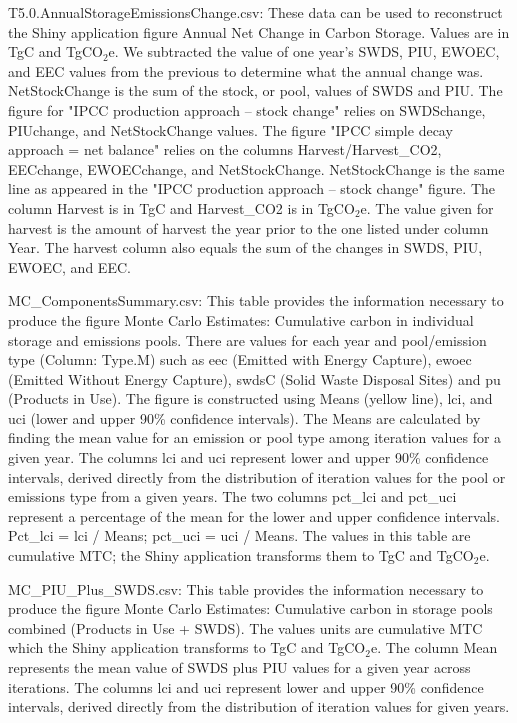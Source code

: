 \documentclass[
]{book}
\begin{document}
T5.0.AnnualStorageEmissionsChange.csv: These data can be used to reconstruct the Shiny application figure Annual Net Change in Carbon Storage. Values are in TgC and TgCO\(_2\)e. We subtracted the value of one year's SWDS, PIU, EWOEC, and EEC values from the previous to determine what the annual change was. NetStockChange is the sum of the stock, or pool, values of SWDS and PIU. The figure for "IPCC production approach -- stock change" relies on SWDSchange, PIUchange, and NetStockChange values. The figure "IPCC simple decay approach = net balance" relies on the columns Harvest/Harvest\_CO2, EECchange, EWOECchange, and NetStockChange. NetStockChange is the same line as appeared in the "IPCC production approach -- stock change" figure. The column Harvest is in TgC and Harvest\_CO2 is in TgCO\(_2\)e. The value given for harvest is the amount of harvest the year prior to the one listed under column Year. The harvest column also equals the sum of the changes in SWDS, PIU, EWOEC, and EEC.

MC\_ComponentsSummary.csv: This table provides the information necessary to produce the figure Monte Carlo Estimates: Cumulative carbon in individual storage and emissions pools. There are values for each year and pool/emission type (Column: Type.M) such as eec (Emitted with Energy Capture), ewoec (Emitted Without Energy Capture), swdsC (Solid Waste Disposal Sites) and pu (Products in Use). The figure is constructed using Means (yellow line), lci, and uci (lower and upper 90\% confidence intervals). The Means are calculated by finding the mean value for an emission or pool type among iteration values for a given year. The columns lci and uci represent lower and upper 90\% confidence intervals, derived directly from the distribution of iteration values for the pool or emissions type from a given years. The two columns pct\_lci and pct\_uci represent a percentage of the mean for the lower and upper confidence intervals. Pct\_lci = lci / Means; pct\_uci = uci / Means. The values in this table are cumulative MTC; the Shiny application transforms them to TgC and TgCO\(_2\)e.

MC\_PIU\_Plus\_SWDS.csv: This table provides the information necessary to produce the figure Monte Carlo Estimates: Cumulative carbon in storage pools combined (Products in Use + SWDS). The values units are cumulative MTC which the Shiny application transforms to TgC and TgCO\(_2\)e. The column Mean represents the mean value of SWDS plus PIU values for a given year across iterations. The columns lci and uci represent lower and upper 90\% confidence intervals, derived directly from the distribution of iteration values for given years.
\end{document}
